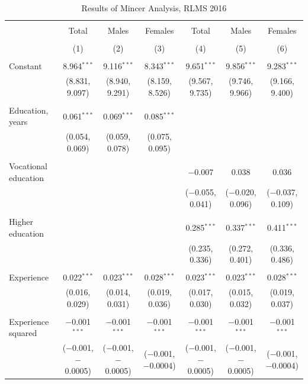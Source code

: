 \documentclass[alpha-refs]{wiley-article-01g}
\begin{document}
\begin{landscape}

\fontsize{9}{11}
\selectfont

\begin{table}[!htbp] \centering 
\renewcommand{\arraystretch}{1.0}
  \caption{Results of Mincer Analysis, RLMS 2016} 
  \label{} 
\begin{tabular}{@{\extracolsep{5pt}}lcccccc} 
\\[-1.8ex]\hline 
\hline \\[-1.8ex] 
 & Total & Males & Females & Total & Males & Females \\ 
\\[-1.8ex] & (1) & (2) & (3) & (4) & (5) & (6)\\ 
\hline \\[-1.8ex] 
 Constant & 8.964$^{***}$ & 9.116$^{***}$ & 8.343$^{***}$ & 9.651$^{***}$ & 9.856$^{***}$ & 9.283$^{***}$ \\ 
  & (8.831, 9.097) & (8.940, 9.291) & (8.159, 8.526) & (9.567, 9.735) & (9.746, 9.966) & (9.166, 9.400) \\ 
  & & & & & & \\ 
 Education, years & 0.061$^{***}$ & 0.069$^{***}$ & 0.085$^{***}$ &  &  &  \\ 
  & (0.054, 0.069) & (0.059, 0.078) & (0.075, 0.095) &  &  &  \\ 
  & & & & & & \\ 
 Vocational education &  &  &  & $-$0.007 & 0.038 & 0.036 \\ 
  &  &  &  & ($-$0.055, 0.041) & ($-$0.020, 0.096) & ($-$0.037, 0.109) \\ 
  & & & & & & \\ 
 Higher education &  &  &  & 0.285$^{***}$ & 0.337$^{***}$ & 0.411$^{***}$ \\ 
  &  &  &  & (0.235, 0.336) & (0.272, 0.401) & (0.336, 0.486) \\ 
  & & & & & & \\ 
 Experience & 0.022$^{***}$ & 0.023$^{***}$ & 0.028$^{***}$ & 0.023$^{***}$ & 0.023$^{***}$ & 0.028$^{***}$ \\ 
  & (0.016, 0.029) & (0.014, 0.031) & (0.019, 0.036) & (0.017, 0.030) & (0.015, 0.032) & (0.019, 0.037) \\ 
  & & & & & & \\ 
 Experience squared & $-$0.001$^{***}$ & $-$0.001$^{***}$ & $-$0.001$^{***}$ & $-$0.001$^{***}$ & $-$0.001$^{***}$ & $-$0.001$^{***}$ \\ 
  & ($-$0.001, $-$0.0005) & ($-$0.001, $-$0.0005) & ($-$0.001, $-$0.0004) & ($-$0.001, $-$0.0005) & ($-$0.001, $-$0.0005) & ($-$0.001, $-$0.0004) \\ 

\end{tabular}
\end{table}
\end{landscape}
\end{document}
